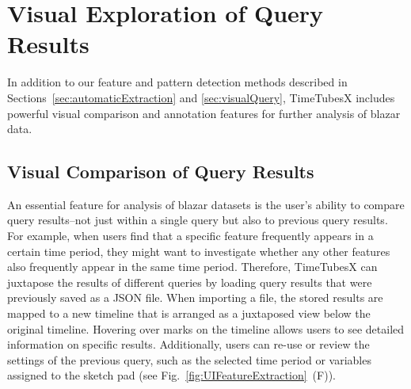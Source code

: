 \section{Visual Exploration of Query Results}\label{sec:otherFunctions}
In addition to our feature and pattern detection methods described in Sections~\ref{sec:automaticExtraction} and \ref{sec:visualQuery}, TimeTubesX includes powerful visual comparison and annotation features for further analysis of blazar data.


\subsection{Visual Comparison of Query Results}
An essential feature for analysis of blazar datasets is the user's ability to compare query results--not just within a single query but also to previous query results. 
For example, when users find that a specific feature frequently appears in a certain time period,
they might want to investigate whether any other features also frequently appear in the same time period.
Therefore, TimeTubesX can juxtapose the results of different queries
by loading query results that were previously saved as a JSON file.
%
When importing a file, the stored results are mapped to a new timeline that is arranged as a juxtaposed view below the original timeline.
Hovering over marks on the timeline allows users to see detailed information on specific results.
Additionally, users can re-use or review the settings of the previous query, such as the selected time period or variables assigned to the sketch pad (see Fig.~\ref{fig:UIFeatureExtraction}~(F)).

